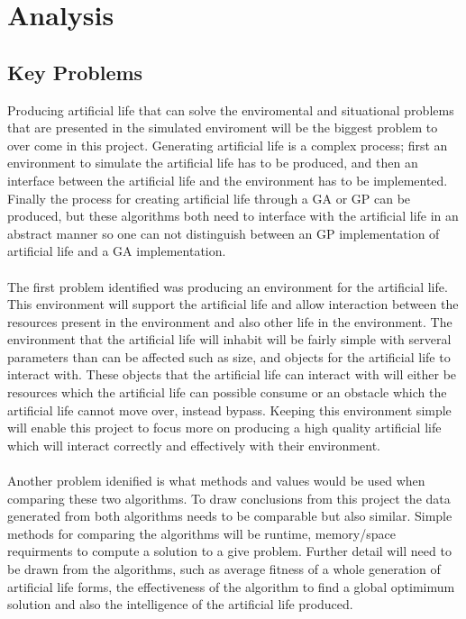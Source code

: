 \documentclass[12pt]{article}
\begin{document}
\section{Analysis}

\subsection{Key Problems}
Producing artificial life that can solve the enviromental and situational problems that are presented in the simulated enviroment %
will be the biggest problem to over come in this project. Generating artificial life is a complex process; first an environment to simulate the artificial life has to be produced, and then
an interface between the artificial life and the environment has to be implemented. Finally the process for creating artificial life through a GA or GP can be produced, but these algorithms
both need to interface with the artificial life in an abstract manner so one can not distinguish between an GP implementation of artificial life and a GA implementation.

\paragraph{}
The first problem identified was producing an environment for the artificial life. This environment will support the artificial life and allow interaction between the resources present
in the environment and also other life in the environment. The environment that the artificial life will inhabit will be fairly simple with serveral parameters than can be affected such as
size, and objects for the artificial life to interact with. These objects that the artificial life can interact with will either be resources which the artificial life can possible consume
or an obstacle which the artificial life cannot move over, instead bypass. Keeping this environment simple will enable this project to focus more on producing a high quality artificial life
which will interact correctly and effectively with their environment. 

\paragraph{}
Another problem idenified is what methods and values would be used when comparing these two algorithms. To draw conclusions from this project the data generated from both algorithms needs 
to be comparable but also similar. Simple methods for comparing the algorithms will be runtime, memory/space requirments to compute a solution to a give problem. Further detail will need to
be drawn from the algorithms, such as average fitness of a whole generation of artificial life forms, the effectiveness of the algorithm to find a global optimimum solution and also the
intelligence of the artificial life produced. 
\end{document}
